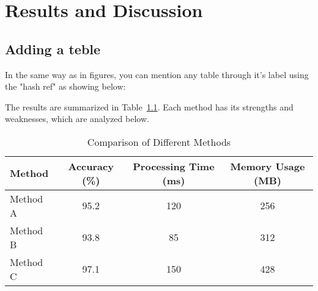 \chapter{Results and Discussion}
\vspace{2em}

\section{Adding a teble}

In the same way as in figures, you can mention any table through it's label using the "hash ref" as showing below:

The results are summarized in Table~\ref{tab:comparison}. Each method has its strengths and weaknesses, which are analyzed below.


\begin{table}[htbp] 
    \centering
    \caption{Comparison of Different Methods} %
    \label{tab:comparison}
    \begin{tabular}{@{}lccc@{}}
        \toprule
        \textbf{Method} & \textbf{Accuracy (\%)} & \textbf{Processing Time (ms)} & \textbf{Memory Usage (MB)} \\
        \midrule
        Method A & 95.2 & 120 & 256 \\
        Method B & 93.8 & 85 & 312 \\
        Method C & 97.1 & 150 & 428 \\
        \bottomrule
    \end{tabular}
\end{table}
